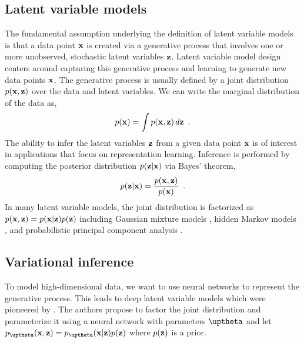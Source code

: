 \subsection{Latent variable models}
The fundamental assumption underlying the definition of latent variable models is that a data point ${\mathbf{x}}$ is created via a generative process that involves one or more unobserved, stochastic latent variables  ${\mathbf{z}}$. 
Latent variable model design centers around capturing this generative process and learning to generate new data points ${\mathbf{x}}$. The generative process is usually defined by a joint distribution $p({\mathbf{x}}, {\mathbf{z}})$ over the data and latent variables. 
We can write the marginal distribution of the data as,
%
\begin{equation} \label{eq:latent-variable-model-marginal-distribution}
    p(\xb) = \int p(\xb,\zb) \, d\zb \enspace .
\end{equation}
%
The ability to infer the latent variables ${\mathbf{z}}$ from a given data point ${\mathbf{x}}$ is of interest in applications that focus on representation learning. Inference is performed by computing the posterior distribution $p({\mathbf{z}}|{\mathbf{x}})$ via Bayes' theorem,
%
\begin{equation} \label{eq:latent-variable-model-posterior-distribution}
    p(\zb|\xb) = \frac{p(\xb,\zb)}{p(\xb)} \enspace .
\end{equation}
%
In many latent variable models, the joint distribution is factorized as $p({\mathbf{x}},{\mathbf{z}}) = p({\mathbf{x}}|{\mathbf{z}})p({\mathbf{z}})$ including Gaussian mixture models \parencite{dempster_maximum_1977}, hidden Markov models \parencite{rabiner_tutorial_1989}, and probabilistic principal component analysis \parencite{tipping_probabilistic_1999}. 



\subsection{Variational inference}
To model high-dimensional data, we want to use neural networks to represent the generative process. 
This leads to deep latent variable models which were pioneered by \textcite{kingma_autoencoding_2014,rezende_stochastic_2014}. The authors propose to factor the joint distribution and parameterize it using a neural network with parameters $\thetab$ and let $p_\thetab(\xb,\zb) = p_\thetab(\xb|\zb)p(\zb)$ where $p({\mathbf{z}})$ is a prior. 


